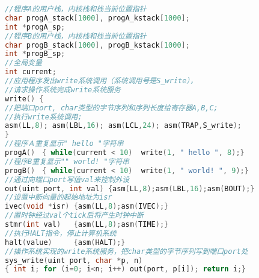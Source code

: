  \begin{lstlisting}[language={C}]
//程序A的用户栈，内核栈和栈当前位置指针
char progA_stack[1000], progA_kstack[1000];
int *progA_sp;
//程序B的用户栈，内核栈和栈当前位置指针
char progB_stack[1000], progB_kstack[1000];
int *progB_sp;
//全局变量
int current;
//应用程序发出write系统调用（系统调用号是S_write），
//请求操作系统完成write系统服务
write() { 
//把端口port, char类型的字节序列和序列长度给寄存器A,B,C; 
//执行write系统调用; 
asm(LL,8); asm(LBL,16); asm(LCL,24); asm(TRAP,S_write);
}
//程序Ａ重复显示" hello "字符串
progA()　{ while(current < 10)  write(1, " hello ", 8);}
//程序B重复显示"" world! "字符串
progB()　{ while(current < 10)  write(1, " world! ", 9);}
//通过向端口port写值val来控制外设
out(uint port, int val) {asm(LL,8);asm(LBL,16);asm(BOUT);}
//设置中断向量的起始地址为isr
ivec(void *isr) {asm(LL,8);asm(IVEC);}
//置时钟经过val个tick后将产生时钟中断
stmr(int val)   {asm(LL,8);asm(TIME);}
//执行HALT指令，停止计算机系统
halt(value)     {asm(HALT);}
//操作系统实现的write系统服务，把char类型的字节序列写到端口port处
sys_write(uint port, char *p, n) 
{ int i; for (i=0; i<n; i++) out(port, p[i]); return i;}


\end{lstlisting}
